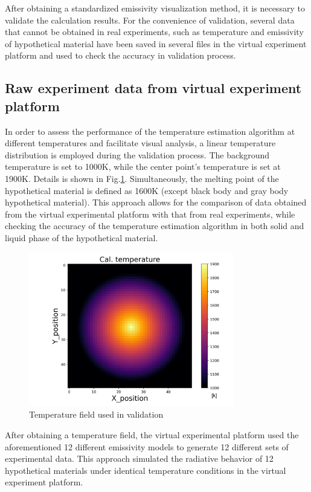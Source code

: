 After obtaining a standardized emissivity visualization method, it is necessary to validate the 
calculation results. For the convenience of validation, several data that cannot be 
obtained in real experiments, such as temperature and emissivity of hypothetical material 
have been saved in several files in the virtual experiment platform and used to 
check the accuracy in validation process.


\subsection{Raw experiment data from virtual experiment platform}
In order to assess the performance of the temperature estimation algorithm 
at different temperatures and facilitate visual analysis, a linear temperature 
distribution is employed during the validation process. The background 
temperature is set to 1000K, while the center point's temperature is 
set at 1900K. Details is shown in Fig.\ref{fig: t_field}. Simultaneously, the melting point of the hypothetical material 
is defined as 1600K (except black body and gray body hypothetical material). 
This approach allows for the comparison of data obtained 
from the virtual experimental platform with that from real experiments, 
while checking the accuracy of the temperature estimation algorithm in 
both solid and liquid phase of the hypothetical material.


\begin{figure}[htbp]
    \centering
    \includegraphics[width=0.8\textwidth]{figures/t_field.jpg}
    \caption{Temperature field used in validation}
    \label{fig: t_field}
\end{figure}


After obtaining a temperature field, the virtual experimental platform 
used the aforementioned 12 different emissivity models to generate 12 
different sets of experimental data. This approach simulated the radiative 
behavior of 12 hypothetical materials under identical temperature conditions 
in the virtual experiment platform.

